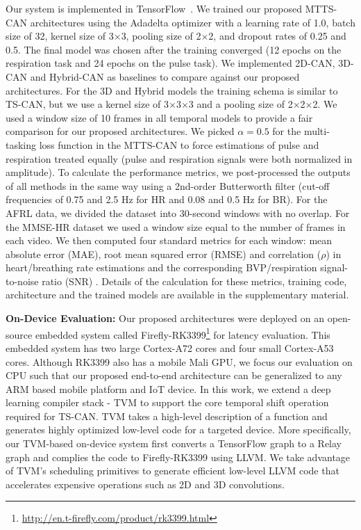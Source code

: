 \documentclass{article}
\begin{document}
Our system is implemented in TensorFlow~\citep{abadi2016tensorflow}. We trained our proposed MTTS-CAN architectures using the Adadelta optimizer \citep{zeiler2012adadelta} with a learning rate of 1.0, batch size of 32, kernel size of 3$\times$3, pooling size of 2$\times$2, and dropout rates of 0.25 and 0.5. The final model was chosen after the training converged (12 epochs on the respiration task and 24 epochs on the pulse task). We implemented 2D-CAN, 3D-CAN and Hybrid-CAN as baselines to compare against our proposed architectures. For the 3D and Hybrid models the training schema is similar to TS-CAN, but we use a kernel size of 3$\times$3$\times$3 and a pooling size of 2$\times$2$\times$2. We used a window size of 10 frames in all temporal models to provide a fair comparison for our proposed architectures. We picked $\alpha=0.5$ for the multi-tasking loss function in the MTTS-CAN to force estimations of pulse and respiration treated equally (pulse and respiration signals were both normalized in amplitude).  
To calculate the performance metrics, we post-processed the outputs of all methods in the same way using a 2nd-order Butterworth filter (cut-off frequencies of 0.75 and 2.5 Hz for HR and 0.08 and 0.5 Hz for BR). For the AFRL data, we divided the dataset into 30-second windows with no overlap. For the MMSE-HR dataset we used a window size equal to the number of frames in each video. We then computed four standard metrics for each window: mean absolute error (MAE), root mean squared error (RMSE) and correlation ($\rho$) in heart/breathing rate estimations and the corresponding BVP/respiration signal-to-noise ratio (SNR) \citep{de2013robust}. Details of the calculation for these metrics, training code, architecture and the trained models are available in the supplementary material. 

\textbf{On-Device Evaluation:} Our proposed architectures were deployed on an open-source embedded system called Firefly-RK3399\footnote{\url{http://en.t-firefly.com/product/rk3399.html}} for latency evaluation. This embedded system has two large Cortex-A72 cores and four small Cortex-A53 cores. Although RK3399 also has a mobile Mali GPU, we focus our evaluation on CPU such that our proposed end-to-end architecture can be generalized to any ARM based mobile platform and IoT device. In this work, we extend a deep learning compiler stack - TVM \citep{chen2018tvm} to support the core temporal shift operation required for TS-CAN. TVM takes a high-level description of a function and generates highly optimized low-level code for a targeted device. More specifically, our TVM-based on-device system first converts a TensorFlow graph to a Relay graph \citep{roesch2018relay} and complies the code to Firefly-RK3399 using LLVM. We take advantage of TVM’s scheduling primitives to generate efficient low-level LLVM code that accelerates expensive operations such as 2D and 3D convolutions.
\end{document}
